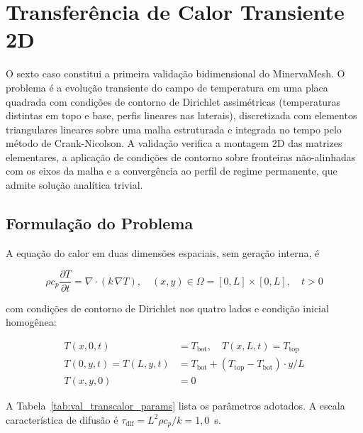 
\section{Transferência de Calor Transiente 2D}
\label{sec:val_transcalor}

O sexto caso constitui a primeira validação bidimensional do MinervaMesh. O problema é a evolução transiente do campo de temperatura em uma placa quadrada com condições de contorno de Dirichlet assimétricas (temperaturas distintas em topo e base, perfis lineares nas laterais), discretizada com elementos triangulares lineares sobre uma malha estruturada e integrada no tempo pelo método de Crank-Nicolson. A validação verifica a montagem 2D das matrizes elementares, a aplicação de condições de contorno sobre fronteiras não-alinhadas com os eixos da malha e a convergência ao perfil de regime permanente, que admite solução analítica trivial.

\subsection{Formulação do Problema}

A equação do calor em duas dimensões espaciais, sem geração interna, é

\begin{equation}
    \rho c_p \frac{\partial T}{\partial t} = \nabla \cdot \left( k \, \nabla T \right), \quad (x,y) \in \Omega = [0, L] \times [0, L], \quad t > 0
    \label{eq:val_transcalor_edp}
\end{equation}

\noindent com condições de contorno de Dirichlet nos quatro lados e condição inicial homogênea:

\begin{equation}
\begin{aligned}
    T(x, 0, t) &= T_{\mathrm{bot}}, \quad T(x, L, t) = T_{\mathrm{top}} \\
    T(0, y, t) = T(L, y, t) &= T_{\mathrm{bot}} + (T_{\mathrm{top}} - T_{\mathrm{bot}}) \cdot y / L \\
    T(x, y, 0) &= 0
\end{aligned}
    \label{eq:val_transcalor_cc}
\end{equation}

A Tabela~\ref{tab:val_transcalor_params} lista os parâmetros adotados. A escala característica de difusão é $\tau_{\mathrm{dif}} = L^2 \rho c_p / k = 1{,}0$~s.

